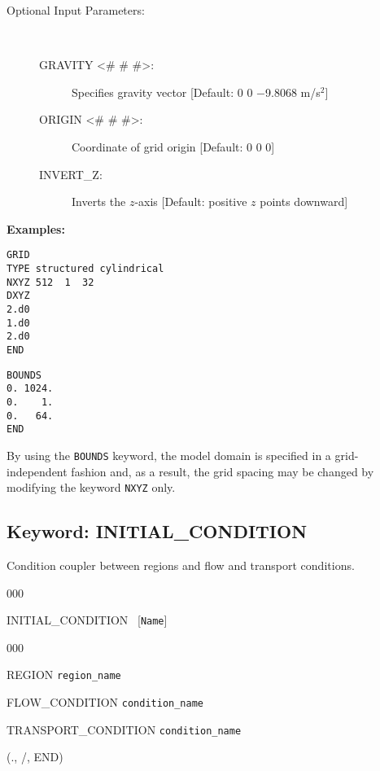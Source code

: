 \documentclass[12pt]{article}
\begin{document}
\begin{description}
\item[Optional Input Parameters:] ~

\begin{description}

\item[GRAVITY <\# \# \#>:] Specifies gravity vector [Default: 0 0 $-$9.8068 m/s$^2$]

\item[ORIGIN <\# \# \#>:] Coordinate of grid origin [Default: 0 0 0]

\item[INVERT\_Z:] Inverts the $z$-axis [Default: positive $z$ points downward]
\end{description}
\end{description}

\noindent
{\bf Examples:}
\begin{verbatim}
GRID
TYPE structured cylindrical
NXYZ 512  1  32
DXYZ
2.d0
1.d0
2.d0
END
\end{verbatim}

\begin{verbatim}
BOUNDS
0. 1024.
0.    1.
0.   64.
END
\end{verbatim}

\noindent
By using the {\tt BOUNDS} keyword, the model domain is specified in a grid-independent fashion and, as a result, the grid spacing may be changed by modifying the keyword {\tt NXYZ} only.


\newpage
\protect\hypertarget{target_init}{}

\subsection{Keyword: INITIAL\_CONDITION}

 Condition coupler between regions and flow and transport conditions.

\begin{deflist}{000}
\item[INITIAL\_CONDITION] \ [{\tt Name}]
\begin{deflist}{000}
\item[REGION] {\tt region\_name}
\item[FLOW\_CONDITION] {\tt condition\_name}
\item[TRANSPORT\_CONDITION] {\tt condition\_name}
\end{deflist}
\item[(., /, END)] ~
\end{deflist}
\end{document}
